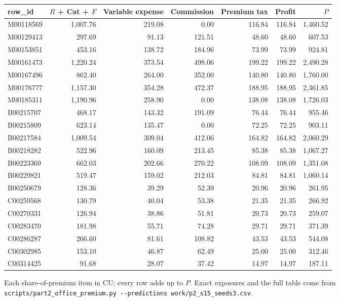 \documentclass[11pt,a4paper]{article}
\makeatletter
\newenvironment{fixedtable}%
  {\par\medskip\noindent\begin{minipage}{\linewidth}\def\@captype{table}\centering}%
  {\end{minipage}\par\medskip}
\newcommand{\code}[1]{\texttt{#1}}
\makeatother
\begin{document}
\begin{fixedtable}
\centering\small
\begin{tabular}{lrrrrrr}
\toprule
row\_id & $R$ + Cat + $F$ & Variable expense & Commission & Premium tax & Profit & $P$\\
\midrule
M00118569 & 1,007.76 & 219.08 & 0.00 & 116.84 & 116.84 & 1,460.52\\
M00129413 & 297.69 & 91.13 & 121.51 & 48.60 & 48.60 & 607.53\\
M00153851 & 453.16 & 138.72 & 184.96 & 73.99 & 73.99 & 924.81\\
M00161473 & 1,220.24 & 373.54 & 498.06 & 199.22 & 199.22 & 2,490.28\\
M00167496 & 862.40 & 264.00 & 352.00 & 140.80 & 140.80 & 1,760.00\\
M00176777 & 1,157.30 & 354.28 & 472.37 & 188.95 & 188.95 & 2,361.85\\
M00185311 & 1,190.96 & 258.90 & 0.00 & 138.08 & 138.08 & 1,726.03\\
B00215707 & 468.17 & 143.32 & 191.09 & 76.44 & 76.44 & 955.46\\
B00215809 & 623.14 & 135.47 & 0.00 & 72.25 & 72.25 & 903.11\\
B00217584 & 1,009.54 & 309.04 & 412.06 & 164.82 & 164.82 & 2,060.29\\
B00218282 & 522.96 & 160.09 & 213.45 & 85.38 & 85.38 & 1,067.27\\
B00223369 & 662.03 & 202.66 & 270.22 & 108.09 & 108.09 & 1,351.08\\
B00229821 & 519.47 & 159.02 & 212.03 & 84.81 & 84.81 & 1,060.14\\
B00250679 & 128.36 & 39.29 & 52.39 & 20.96 & 20.96 & 261.95\\
C00259568 & 130.79 & 40.04 & 53.38 & 21.35 & 21.35 & 266.92\\
C00270331 & 126.94 & 38.86 & 51.81 & 20.73 & 20.73 & 259.07\\
C00283470 & 181.98 & 55.71 & 74.28 & 29.71 & 29.71 & 371.39\\
C00286287 & 266.60 & 81.61 & 108.82 & 43.53 & 43.53 & 544.08\\
C00302985 & 153.10 & 46.87 & 62.49 & 25.00 & 25.00 & 312.46\\
C00314425 & 91.68 & 28.07 & 37.42 & 14.97 & 14.97 & 187.11\\
\bottomrule
\end{tabular}
\caption{Each share-of-premium item in CU; every row adds up to $P$. Exact exposures and the full table come from
\code{scripts/part2\_office\_premium.py -{}-predictions work/p2\_s15\_seeds3.csv}.}
\end{fixedtable}
\end{document}
